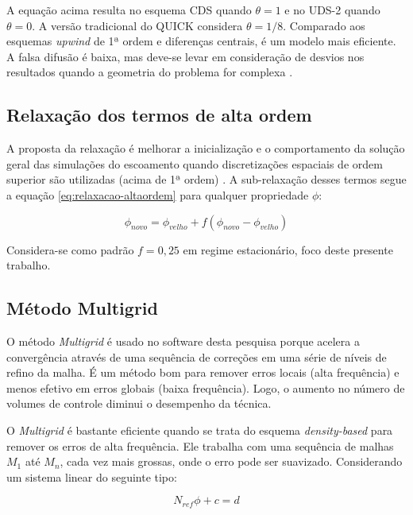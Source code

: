 A equação acima resulta no esquema CDS quando $\theta = 1$ e no UDS-2 quando $\theta = 0$. A versão tradicional do QUICK \cite{Leonard1979} considera $\theta = 1/8$. Comparado aos esquemas \textit{upwind} de 1ª ordem e diferenças centrais, é um modelo mais eficiente. A falsa difusão é baixa, mas deve-se levar em consideração de desvios nos resultados quando a geometria do problema for complexa \cite{Leonard1979}.

\subsection{Relaxação dos termos de alta ordem}

A proposta da relaxação é melhorar a inicialização e o comportamento da solução geral das simulações do escoamento quando discretizações espaciais de ordem superior são utilizadas (acima de 1ª ordem) \cite{fluent2021ansys}. A sub-relaxação desses termos segue a equação \ref{eq:relaxacao-altaordem} para qualquer propriedade $\phi$:

\begin{equation}
    \label{eq:relaxacao-altaordem}
    \phi_{novo} = \phi_{velho} + f(\phi_{novo} - \phi_{velho})
\end{equation}

Considera-se como padrão $f = 0,25$ em regime estacionário, foco deste presente trabalho.

\subsection{Método Multigrid}

O método \textit{Multigrid} \cite{Hutchinson1986} é usado no software desta pesquisa porque acelera a convergência através de uma sequência de correções em uma série de níveis de refino da malha. É um método bom para remover erros locais (alta frequência) e menos efetivo em erros globais (baixa frequência). Logo, o aumento no número de volumes de controle diminui o desempenho da técnica.

O \textit{Multigrid} é bastante eficiente quando se trata do esquema \textit{density-based} para remover os erros de alta frequência. Ele trabalha com uma sequência de malhas $M_1$ até $M_n$, cada vez mais grossas, onde o erro pode ser suavizado. Considerando um sistema linear do seguinte tipo:

\begin{equation}
    \label{eq:sistema-linear-multigrid}
    N_{ref}\phi + c = d
\end{equation}

